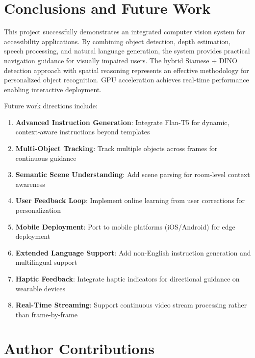 \documentclass{article}
\begin{document}
\section{Conclusions and Future Work}

This project successfully demonstrates an integrated computer vision system for accessibility applications. By combining object detection, depth estimation, speech processing, and natural language generation, the system provides practical navigation guidance for visually impaired users. The hybrid Siamese + DINO detection approach with spatial reasoning represents an effective methodology for personalized object recognition. GPU acceleration achieves real-time performance enabling interactive deployment.

Future work directions include:

\begin{enumerate}
    \item \textbf{Advanced Instruction Generation}: Integrate Flan-T5 for dynamic, context-aware instructions beyond templates
    \item \textbf{Multi-Object Tracking}: Track multiple objects across frames for continuous guidance
    \item \textbf{Semantic Scene Understanding}: Add scene parsing for room-level context awareness
    \item \textbf{User Feedback Loop}: Implement online learning from user corrections for personalization
    \item \textbf{Mobile Deployment}: Port to mobile platforms (iOS/Android) for edge deployment
    \item \textbf{Extended Language Support}: Add non-English instruction generation and multilingual support
    \item \textbf{Haptic Feedback}: Integrate haptic indicators for directional guidance on wearable devices
    \item \textbf{Real-Time Streaming}: Support continuous video stream processing rather than frame-by-frame
\end{enumerate}

\section{Author Contributions}
\end{document}
